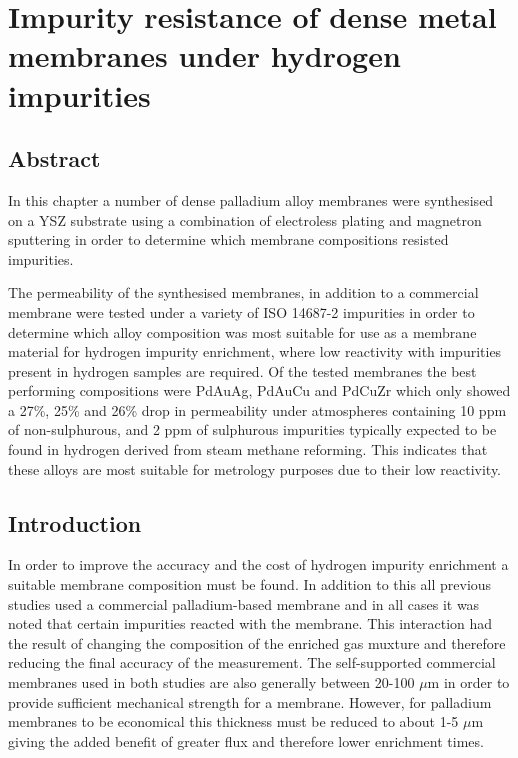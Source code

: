 

\chapter{Impurity resistance of dense metal membranes under hydrogen impurities}\label{testingchapref}
\section*{Abstract}
In this chapter a number of dense palladium alloy membranes were synthesised on a YSZ substrate using a combination of electroless plating and magnetron sputtering in order to determine which membrane compositions resisted impurities. 

The permeability of the synthesised membranes, in addition to a commercial membrane were tested under a variety of ISO 14687-2 impurities in order to determine which alloy composition was most suitable for use as a membrane material for hydrogen impurity enrichment, where low reactivity with impurities present in hydrogen samples are required. Of the tested membranes the best performing compositions were PdAuAg, PdAuCu and PdCuZr which only showed a 27\%, 25\% and 26\% drop in permeability under atmospheres containing 10 ppm of non-sulphurous, and 2 ppm of sulphurous impurities typically expected to be found in hydrogen derived from steam methane reforming.  This indicates that these alloys are most suitable for metrology purposes due to their low reactivity. 

\section{Introduction}
In order to improve the accuracy and the cost of hydrogen impurity enrichment a suitable membrane composition must be found. In addition to this all previous studies used a commercial palladium-based membrane and in all cases it was noted that certain impurities reacted with the membrane. This interaction had the result of changing the composition of the enriched gas muxture and therefore reducing the final accuracy of the measurement. \cite{Murugan2014, Ahmed2010} The self-supported commercial membranes used in both studies are also generally between 20-100 $\mu$m in order to provide sufficient mechanical strength for a membrane. However, for palladium membranes to be economical this thickness must be reduced to about 1-5 $\mu$m giving the added benefit of greater flux and therefore lower enrichment times. 

